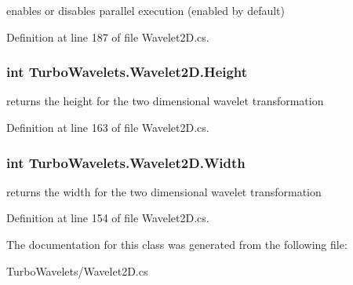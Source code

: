 enables or disables parallel execution (enabled by default) 



\-Definition at line 187 of file \-Wavelet2\-D.\-cs.

\hypertarget{class_turbo_wavelets_1_1_wavelet2_d_a277d0f89d73f839350c64a83ccd76ff6}{
\subsubsection[{\-Height}]{\setlength{\rightskip}{0pt plus 5cm}int {\bf \-Turbo\-Wavelets.\-Wavelet2\-D.\-Height}}}\label{class_turbo_wavelets_1_1_wavelet2_d_a277d0f89d73f839350c64a83ccd76ff6}


returns the height for the two dimensional wavelet transformation 



\-Definition at line 163 of file \-Wavelet2\-D.\-cs.

\hypertarget{class_turbo_wavelets_1_1_wavelet2_d_a30058c5e0e5bd95b29bc080efbcf9083}{
\subsubsection[{\-Width}]{\setlength{\rightskip}{0pt plus 5cm}int {\bf \-Turbo\-Wavelets.\-Wavelet2\-D.\-Width}}}\label{class_turbo_wavelets_1_1_wavelet2_d_a30058c5e0e5bd95b29bc080efbcf9083}


returns the width for the two dimensional wavelet transformation 



\-Definition at line 154 of file \-Wavelet2\-D.\-cs.



\-The documentation for this class was generated from the following file\-:\begin{DoxyCompactItemize}
\item 
\-Turbo\-Wavelets/\-Wavelet2\-D.\-cs\end{DoxyCompactItemize}
